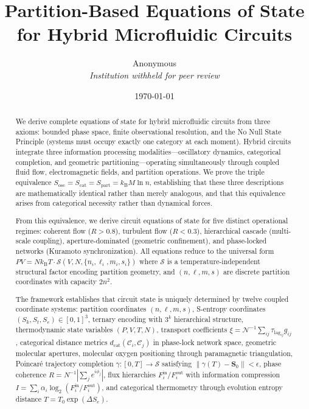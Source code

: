\documentclass[12pt,a4paper]{article}
\title{\textbf{Partition-Based Equations of State for Hybrid Microfluidic Circuits}}
\author{
Anonymous\\
\textit{Institution withheld for peer review}
}
\date{\today}
\theoremstyle{plain}
\theoremstyle{definition}
\theoremstyle{remark}
\newcommand{\kB}{k_{\mathrm{B}}}
\newcommand{\Sspace}{\mathcal{S}}
\newcommand{\Sk}{S_k}
\newcommand{\St}{S_t}
\newcommand{\Se}{S_e}
\newcommand{\Scoord}{\mathbf{S}}
\newcommand{\Sosc}{S_{\mathrm{osc}}}
\newcommand{\Scat}{S_{\mathrm{cat}}}
\newcommand{\Spart}{S_{\mathrm{part}}}
\newcommand{\dcat}{d_{\mathrm{cat}}}
\newcommand{\taulag}{\tau_{\mathrm{lag}}}
\begin{document}
\maketitle

\begin{abstract}
We derive complete equations of state for hybrid microfluidic circuits from three axioms: bounded phase space, finite observational resolution, and the No Null State Principle (systems must occupy exactly one category at each moment). Hybrid circuits integrate three information processing modalities—oscillatory dynamics, categorical completion, and geometric partitioning—operating simultaneously through coupled fluid flow, electromagnetic fields, and partition operations. We prove the triple equivalence $\Sosc = \Scat = \Spart = \kB M \ln n$, establishing that these three descriptions are mathematically identical rather than merely analogous, and that this equivalence arises from categorical necessity rather than dynamical forces.

From this equivalence, we derive circuit equations of state for five distinct operational regimes: coherent flow ($R > 0.8$), turbulent flow ($R < 0.3$), hierarchical cascade (multi-scale coupling), aperture-dominated (geometric confinement), and phase-locked networks (Kuramoto synchronization). All equations reduce to the universal form $PV = N\kB T \cdot \mathcal{S}(V,N,\{n_i,\ell_i,m_i,s_i\})$ where $\mathcal{S}$ is a temperature-independent structural factor encoding partition geometry, and $(n,\ell,m,s)$ are discrete partition coordinates with capacity $2n^2$.

The framework establishes that circuit state is uniquely determined by twelve coupled coordinate systems: partition coordinates $(n,\ell,m,s)$, S-entropy coordinates $(\Sk,\St,\Se) \in [0,1]^3$, ternary encoding with $3^k$ hierarchical structure, thermodynamic state variables $(P,V,T,N)$, transport coefficients $\xi = \mathcal{N}^{-1} \sum_{ij} \taulag_{ij} g_{ij}$, categorical distance metrics $\dcat(\mathcal{C}_i,\mathcal{C}_j)$ in phase-lock network space, geometric molecular apertures, molecular oxygen positioning through paramagnetic triangulation, Poincaré trajectory completion $\gamma: [0,T] \to \Sspace$ satisfying $\|\gamma(T) - \Scoord_0\| < \epsilon$, phase coherence $R = N^{-1}|\sum_j e^{i\phi_j}|$, flux hierarchies $F_i^{\text{in}}/F_i^{\text{out}}$ with information compression $I = \sum_i \alpha_i \log_2(F_i^{\text{in}}/F_i^{\text{out}})$, and categorical thermometry through evolution entropy distance $T = T_0 \exp(\Delta \Se)$.


\end{abstract}
\end{document}
